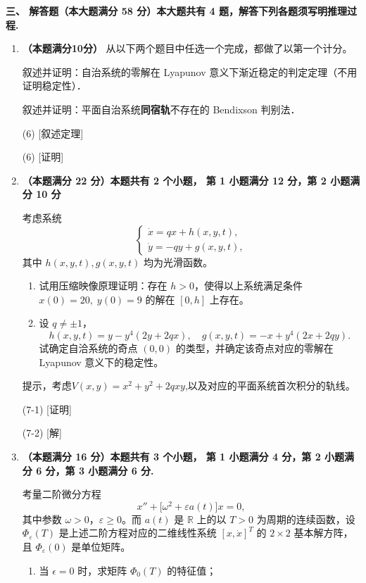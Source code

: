 \textbf{三、 解答题（本大题满分 58 分）本大题共有 4 题，解答下列各题须写明推理过程.}
\begin{enumerate}
\item \textbf{（本题满分10分）}
从以下两个题目中任选一个完成，都做了以第一个计分。

叙述并证明：自治系统的零解在 Lyapunov 意义下渐近稳定的判定定理（不用证明稳定性）．

叙述并证明：平面自治系统\textbf{同宿轨}不存在的 Bendixson 判别法．

(6) [叙述定理]

(6) [证明]

\item \textbf{（本题满分 22 分）本题共有 2 个小题，
第 1 小题满分 12 分，第 2 小题满分 10 分}

考虑系统
\[
\begin{cases}
\dot{x} = qx+ h(x, y, t), \\
\dot{y} = -qy + g(x, y, t),
\end{cases}
\]
其中 $h(x, y, t), g(x, y, t)$ 均为光滑函数。
\begin{enumerate}
    \item[(1)] 试用压缩映像原理证明：存在 $h > 0$，使得以上系统满足条件 $x(0) = 20,\; y(0) = 9$ 的解在 $[0, h]$ 上存在。
    
    \item[(2)] 设 $q \not = \pm 1$，
    \[
    h(x, y, t) = y - y^4 (2y + 2qx), \quad
    g(x, y, t) = -x + y^4 (2x + 2qy).
    \]
    试确定自洽系统的奇点 $(0, 0)$ 的类型，并确定该奇点对应的零解在 Lyapunov 意义下的稳定性。
\end{enumerate}

提示，考虑$V(x,y)=x^2+y^2+2qxy$,以及对应的平面系统首次积分的轨线。

(7-1) [证明]

(7-2) [解]


\item \textbf{（本题满分 16 分）本题共有 3 个小题，
第 1 小题满分 4 分，第 2 小题满分 6 分，第 3 小题满分 6 分.}

考量二阶微分方程 
\[
x'' + \bigl[\omega^2 + \varepsilon  a(t)\bigr] x = 0,
\] 
其中参数 $\omega > 0$，$\varepsilon \geqslant 0$。而 $a(t)$ 是 $\mathbb{R}$ 上的以 $T > 0$ 为周期的连续函数，设 $\Phi_{\varepsilon}(T)$ 是上述二阶方程对应的二维线性系统 $[x, \dot{x}]^T$ 的 $2 \times 2$ 基本解方阵，且 $\Phi_{\varepsilon}(0)$ 是单位矩阵。

\begin{enumerate}
    \item[(1)] 当 $\epsilon = 0$ 时，求矩阵 $\Phi_0(T)$ 的特征值；
    

\end{enumerate}
\end{enumerate}

